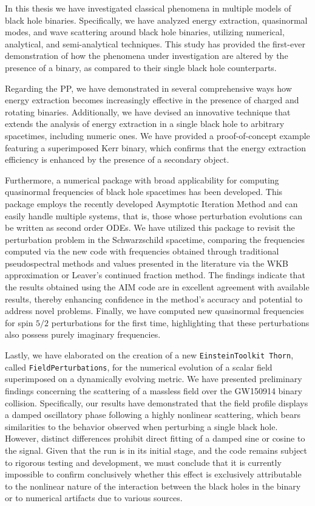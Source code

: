 In this thesis we have investigated classical phenomena in multiple models of black hole binaries. Specifically, we have analyzed energy extraction, quasinormal modes, and wave scattering around black hole binaries, utilizing numerical, analytical, and semi-analytical techniques. This study has provided the first-ever demonstration of how the phenomena under investigation are altered by the presence of a binary, as compared to their single black hole counterparts.

Regarding the \ac{PP}, we have demonstrated in several comprehensive ways how energy extraction becomes increasingly effective in the presence of charged and rotating binaries. Additionally, we have devised an innovative technique that extends the analysis of energy extraction in a single black hole to arbitrary spacetimes, including numeric ones. We have provided a proof-of-concept example featuring a superimposed Kerr binary, which confirms that the energy extraction efficiency is enhanced by the presence of a secondary object.

Furthermore, a numerical package with broad applicability for computing quasinormal frequencies of black hole spacetimes has been developed. This package employs the recently developed Asymptotic Iteration Method and can easily handle multiple systems, that is, those whose perturbation evolutions can be written as second order ODEs. We have utilized this package to revisit the perturbation problem in the Schwarzschild spacetime, comparing the frequencies computed via the new code with frequencies obtained through traditional pseudospectral methods and values presented in the literature via the WKB approximation or Leaver's continued fraction method. The findings indicate that the results obtained using the \ac{AIM} code are in excellent agreement with available results, thereby enhancing confidence in the method's accuracy and potential to address novel problems. Finally, we have computed new quasinormal frequencies for spin $5/2$ perturbations for the first time, highlighting that these perturbations also possess purely imaginary frequencies.

Lastly, we have elaborated on the creation of a new \texttt{EinsteinToolkit Thorn}, called \texttt{FieldPerturbations}, for the numerical evolution of a scalar field superimposed on a dynamically evolving metric. We have presented preliminary findings concerning the scattering of a massless field over the GW150914 binary collision. Specifically, our results have demonstrated that the field profile displays a damped oscillatory phase following a highly nonlinear scattering, which bears similarities to the behavior observed when perturbing a single black hole. However, distinct differences prohibit direct fitting of a damped sine or cosine to the signal. Given that the run is in its initial stage, and the code remains subject to rigorous testing and development, we must conclude that it is currently impossible to confirm conclusively whether this effect is exclusively attributable to the nonlinear nature of the interaction between the black holes in the binary or to numerical artifacts due to various sources.

